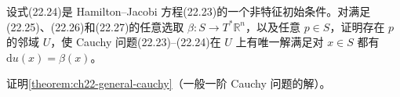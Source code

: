 \documentclass[../../main.tex]{subfiles}
\begin{document}
\begin{exercise}\label{exercise:ch22-p22-25}
设式(22.24)是 Hamilton--Jacobi 方程(22.23)的一个非特征初始条件。对满足(22.25)、(22.26)和(22.27)的任意选取 $\beta:S\to T^*\mathbb R^n$，以及任意 $p\in S$，证明存在 $p$ 的邻域 $U$，使 Cauchy 问题(22.23)--(22.24)在 $U$ 上有唯一解满足对 $x\in S$ 都有 $\mathrm{d}u(x)=\beta(x)$。
\end{exercise}

\begin{exercise}\label{exercise:ch22-p22-26}
证明\cref{theorem:ch22-general-cauchy}（一般一阶 Cauchy 问题的解）。
\end{exercise}
\end{document}
